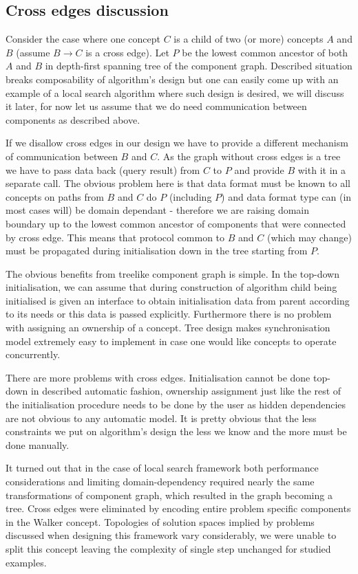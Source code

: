 \subsection{Cross edges discussion}
Consider the case where one concept $C$ is a child of two (or more) concepts
$A$ and $B$ (assume $B \to C$ is a cross edge). Let $P$ be the lowest common
ancestor of both $A$ and $B$ in depth-first spanning tree of the component
graph. Described situation breaks composability of algorithm's design but one
can easily come up with an example of a local search algorithm where such
design is desired, we will discuss it later, for now let us assume that we do
need communication between components as described above.

If we disallow cross edges in our design we have to provide a different mechanism
of communication between $B$ and $C$. As the graph without cross edges is a
tree we have to pass data back (query result) from $C$ to $P$ and provide $B$
with it in a separate call. The obvious problem here is that data format must be
known to all concepts on paths from $B$ and $C$ do $P$ (including $P$) and data
format type can (in most cases will) be domain dependant - therefore we are
raising domain boundary up to the lowest common ancestor of components that were
connected by cross edge. This means that protocol common to $B$ and $C$ (which
may change) must be propagated during initialisation down in the tree starting
from $P$.

The obvious benefits from treelike component graph is simple. In the top-down
initialisation, we can assume that during construction of algorithm child being
initialised is given an interface to obtain initialisation data from parent
according to its needs or this data is passed explicitly. Furthermore there is
no problem with assigning an ownership of a concept. Tree design makes
synchronisation model extremely easy to implement in case one would like
concepts to operate concurrently.

There are more problems with cross edges. Initialisation cannot be done
top-down in described automatic fashion, ownership assignment just like the
rest of the initialisation procedure needs to be done by the user as hidden
dependencies are not obvious to any automatic model. It is pretty obvious that
the less constraints we put on algorithm's design the less we know and the more
must be done manually.

It turned out that in the case of local search framework both performance
considerations and limiting domain-dependency required nearly the same
transformations of component graph, which resulted in the graph becoming a
tree. Cross edges were eliminated by encoding entire problem specific
components in the Walker concept. Topologies of solution spaces implied by
problems discussed when designing this framework vary considerably, we were
unable to split this concept leaving the complexity of single step unchanged for
studied examples.

